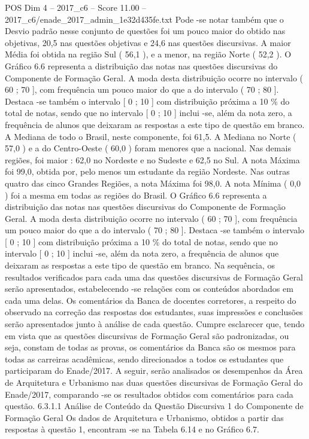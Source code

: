 \begin{textsample}{POS Dim 4 – 2017\_c6 – Score 11.00 – 2017\_c6/enade\_2017\_admin\_1e32d435fe.txt}
Pode -se notar também que o Desvio padrão nesse conjunto de questões foi um pouco maior do obtido nas objetivas, 20,5 nas questões objetivas e 24,6 nas questões discursivas.
A maior Média foi obtida na região Sul ( 56,1 ), e a menor, na região Norte ( 52,2 ).
O Gráfico 6.6 representa a distribuição das notas nas questões discursivas do Componente de Formação Geral.
A moda desta distribuição ocorre no intervalo ( 60 ; 70 ], com frequência um pouco maior do que a do intervalo ( 70 ; 80 ].
Destaca -se também o intervalo [ 0 ; 10 ] com distribuição próxima a 10 \% do total de notas, sendo que no intervalo [ 0 ; 10 ] inclui -se, além da nota zero, a frequência de alunos que deixaram as respostas a este tipo de questão em branco.
A Mediana de todo o Brasil, neste componente, foi 61,5.
A Mediana no Norte ( 57,0 ) e a do Centro-Oeste ( 60,0 ) foram menores que a nacional.
Nas demais regiões, foi maior : 62,0 no Nordeste e no Sudeste e 62,5 no Sul.
A nota Máxima foi 99,0, obtida por, pelo menos um estudante da região Nordeste.
Nas outras quatro das cinco Grandes Regiões, a nota Máxima foi 98,0.
A nota Mínima ( 0,0 ) foi a mesma em todas as regiões do Brasil.
O Gráfico 6.6 representa a distribuição das notas nas questões discursivas do Componente de Formação Geral.
A moda desta distribuição ocorre no intervalo ( 60 ; 70 ], com frequência um pouco maior do que a do intervalo ( 70 ; 80 ].
Destaca -se também o intervalo [ 0 ; 10 ] com distribuição próxima a 10 \% do total de notas, sendo que no intervalo [ 0 ; 10 ] inclui -se, além da nota zero, a frequência de alunos que deixaram as respostas a este tipo de questão em branco.
Na sequência, os resultados verificados para cada uma das questões discursivas de Formação Geral serão apresentados, estabelecendo -se relações com os conteúdos abordados em cada uma delas.
Os comentários da Banca de docentes corretores, a respeito do observado na correção das respostas dos estudantes, suas impressões e conclusões serão apresentados junto à análise de cada questão.
Cumpre esclarecer que, tendo em vista que as questões discursivas de Formação Geral são padronizadas, ou seja, constam de todas as provas, os comentários da Banca são os mesmos para todas as carreiras acadêmicas, sendo direcionados a todos os estudantes que participaram do Enade/2017.
A seguir, serão analisados os desempenhos da Área de Arquitetura e Urbanismo nas duas questões discursivas de Formação Geral do Enade/2017, comparando -se os resultados obtidos com comentários para cada questão. 6.3.1.1 Análise de Conteúdo da Questão Discursiva 1 do Componente de Formação Geral Os dados de Arquitetura e Urbanismo, obtidos a partir das respostas à questão 1, encontram -se na Tabela 6.14 e no Gráfico 6.7.

\end{textsample}
